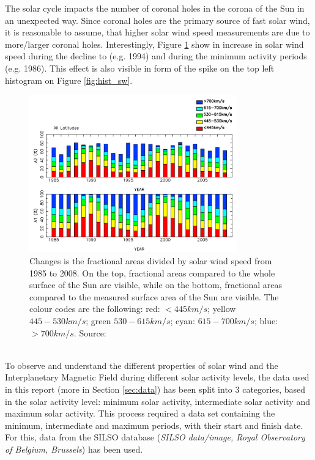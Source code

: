 \documentclass[12pt]{article}
\begin{document}
        The solar cycle impacts the number of coronal holes in the corona of the Sun in an unexpected way. Since coronal holes are the primary source of fast solar wind, it is reasonable to assume, that higher solar wind speed measurements are due to more/larger coronal holes. Interestingly, Figure \ref{fig:sw_speeds} show in increase in solar wind speed during the decline to (e.g. 1994) and during the minimum activity periods (e.g. 1986)\cite{2010tokumaru}. This effect is also visible in form of the spike on the top left histogram on Figure \ref{fig:hist_sw}.\\
        \begin{figure}[t!]
            \centering
            \includegraphics[width=0.8\textwidth]{fig_theory/sw_speed_distribution.PNG}
            \caption{Changes is the fractional areas divided by solar wind speed from 1985 to 2008. On the top, fractional areas compared to the whole surface of the Sun are visible, while on the bottom, fractional areas compared to the measured surface area of the Sun are visible. The colour codes are the following: red: $<445km/s$; yellow $445-530km/s$; green $530-615km/s$; cyan: $615-700km/s$; blue: $>700km/s$. Source: \cite{2010tokumaru}}
            \label{fig:sw_speeds}
        \end{figure}\\
        To observe and understand the different properties of solar wind and the Interplanetary Magnetic Field during different solar activity levels, the data used in this report (more in Section \ref{sec:data}) has been split into 3 categories, based in the solar activity level: minimum solar activity, intermediate solar activity and maximum solar activity. This process required a data set containing the minimum, intermediate and maximum periods, with their start and finish date. For this, data from the SILSO database (\textit{SILSO data/image, Royal Observatory of Belgium, Brussels}) has been used.\\ \\
\end{document}
